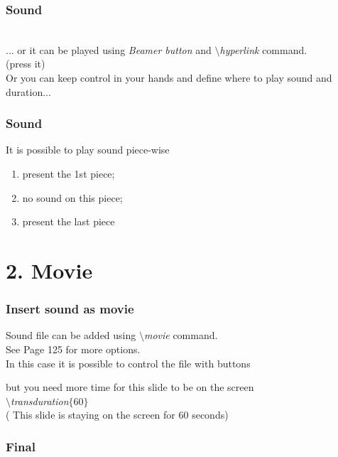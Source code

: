 \documentclass[envcountsect]{beamer}
\begin{document}
\begin{frame}
\frametitle{Sound} \transblindsvertical {}
\\

... or it can be played using {\it Beamer button} and {\it $\setminus$hyperlink} command.\\
 (press it)\\

 \vspace{10pt}
 Or you can keep control in your hands and define where
to play sound and duration...
\transwipe {}
\end{frame}
\begin{frame}
\frametitle{Sound} \transblindshorizontal
\begin{theorem}
It is possible to play sound piece-wise
\begin{enumerate}
\item<1-> present the 1st piece;
\item<2-> no sound on this piece;
\item<3-> present the last piece
\end{enumerate}
\end{theorem}
\end{frame}


\section{2. Movie}

\begin{frame}
\frametitle{Insert sound as movie}
\transglitter {}
Sound file can be added using {\it $\setminus$movie} command.\\
 See Page 125 for more options.\\

In this case it is possible to control  the file with buttons\\


but you need more time for this slide to be on the screen\\
{\it $\setminus$transduration$\{60\}$}  \\

  ( This slide is staying on the screen for  60 seconds)


\end{frame}

\begin{frame}
\frametitle{Final}
\transglitter
{}

\end{frame}
\end{document}
